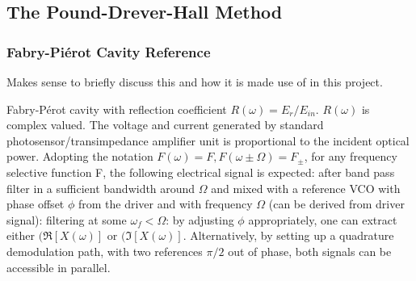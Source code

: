 
\subsection{The Pound-Drever-Hall Method}

\subsubsection{Fabry-Pi{\'e}rot Cavity Reference}

Makes sense to briefly discuss this and how it is made use of in this project.

Fabry-P{\'e}rot cavity with reflection coefficient $R(\omega)=E_{r}/E_{in}$.
$R(\omega)$ is complex valued. The voltage and current generated by standard photosensor/transimpedance amplifier unit is proportional to the incident optical power. Adopting the notation $F(\omega) = F, F(\omega \pm \Omega) = F_\pm$, for any frequency selective function F, the following electrical signal is expected:
after band pass filter in a sufficient bandwidth around $\Omega$ and mixed with a reference VCO with phase offset $\phi$ from the driver and with frequency $\Omega$ (can be derived from driver signal):
filtering at some $\omega_f < \Omega$:
by adjusting $\phi$ appropriately, one can extract either $(\Re[X(\omega)]$ or $(\Im[X(\omega)]$. Alternatively, by setting up a quadrature demodulation path, with two references $\pi/2$ out of phase, both signals can be accessible in parallel.

